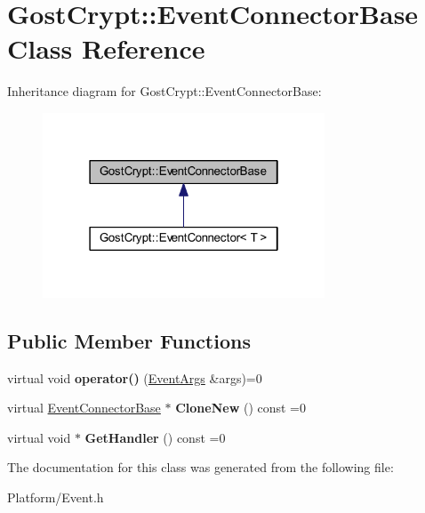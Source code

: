 \hypertarget{class_gost_crypt_1_1_event_connector_base}{}\section{Gost\+Crypt\+:\+:Event\+Connector\+Base Class Reference}
\label{class_gost_crypt_1_1_event_connector_base}


Inheritance diagram for Gost\+Crypt\+:\+:Event\+Connector\+Base\+:
\nopagebreak
\begin{figure}[H]
\begin{center}
\leavevmode
\includegraphics[width=238pt]{class_gost_crypt_1_1_event_connector_base__inherit__graph}
\end{center}
\end{figure}
\subsection*{Public Member Functions}
\begin{DoxyCompactItemize}
\item 
\mbox{\label{class_gost_crypt_1_1_event_connector_base_a7cc74bb087403d897bba5cdbfddda617}} 
virtual void {\bfseries operator()} (\hyperlink{struct_gost_crypt_1_1_event_args}{Event\+Args} \&args)=0
\item 
\mbox{\label{class_gost_crypt_1_1_event_connector_base_a2a27c31fe912b0510bca0e30fada48a7}} 
virtual \hyperlink{class_gost_crypt_1_1_event_connector_base}{Event\+Connector\+Base} $\ast$ {\bfseries Clone\+New} () const =0
\item 
\mbox{\label{class_gost_crypt_1_1_event_connector_base_a28ef023479c972445d2aab54dad0bb32}} 
virtual void $\ast$ {\bfseries Get\+Handler} () const =0
\end{DoxyCompactItemize}


The documentation for this class was generated from the following file\+:\begin{DoxyCompactItemize}
\item 
Platform/Event.\+h\end{DoxyCompactItemize}
